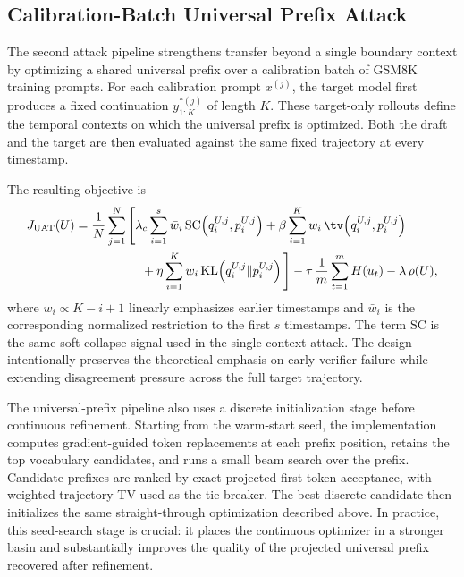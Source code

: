 \subsection{Calibration-Batch Universal Prefix Attack}

The second attack pipeline strengthens transfer beyond a single boundary
context by optimizing a shared universal prefix over a calibration batch of
GSM8K training prompts. For each calibration prompt $x^{(j)}$, the target
model first produces a fixed continuation $y^{*(j)}_{1:K}$ of length $K$.
These target-only rollouts define the temporal contexts on which the universal
prefix is optimized. Both the draft and the target are then evaluated against
the same fixed trajectory at every timestamp.

The resulting objective is
\begin{align*}
J_{\mathrm{UAT}}(U) ={}&
\frac{1}{N}\sum_{j=1}^{N}
\Bigg[
\lambda_c \sum_{i=1}^{s} \bar{w}_i\,
\mathrm{SC}\!\left(q_i^{U,j}, p_i^{U,j}\right)
+ \beta \sum_{i=1}^{K} w_i\,\tv\!\left(q_i^{U,j}, p_i^{U,j}\right)
\\
&\qquad\qquad
+ \eta \sum_{i=1}^{K} w_i\,\mathrm{KL}\!\left(q_i^{U,j} \Vert p_i^{U,j}\right)
\Bigg]
- \tau \,\frac{1}{m}\sum_{t=1}^{m} H(u_t)
- \lambda \,\rho(U),
\end{align*}
where $w_i \propto K-i+1$ linearly emphasizes earlier timestamps and
$\bar{w}_i$ is the corresponding normalized restriction to the first $s$
timestamps. The term $\mathrm{SC}$ is the same soft-collapse signal used in the
single-context attack. The design intentionally preserves the theoretical
emphasis on early verifier failure while extending disagreement pressure across
the full target trajectory.

The universal-prefix pipeline also uses a discrete initialization stage before
continuous refinement. Starting from the warm-start seed, the implementation
computes gradient-guided token replacements at each prefix position, retains
the top vocabulary candidates, and runs a small beam search over the prefix.
Candidate prefixes are ranked by exact projected first-token acceptance, with
weighted trajectory TV used as the tie-breaker. The best discrete candidate
then initializes the same straight-through optimization described above. In
practice, this seed-search stage is crucial: it places the continuous optimizer
in a stronger basin and substantially improves the quality of the projected
universal prefix recovered after refinement.
